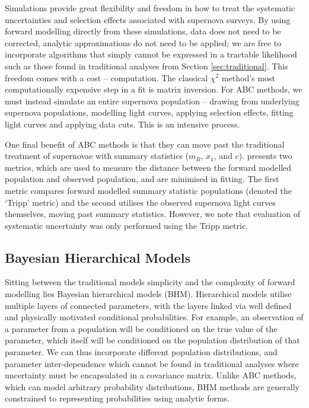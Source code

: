 \documentclass[a4paper,fleqn,usenatbib]{emulateapj}
\begin{document}
Simulations provide great flexibility and freedom in how to treat the systematic uncertainties and selection effects associated with supernova surveys. By using forward modelling directly from these simulations, data does not need to be corrected, analytic approximations do not need to be applied; we are free to incorporate algorithms that simply cannot be expressed in a tractable likelihood such as those found in traditional analyses from Section \ref{sec:traditional}. This freedom comes with a cost -- computation. The classical $\chi^2$ method's most computationally expensive step in a fit is matrix inversion. For ABC methods, we must instead simulate an entire supernova population -- drawing from underlying supernova populations, modelling light curves, applying selection effects, fitting light curves and applying data cuts. This is an intensive process.

One final benefit of ABC methods is that they can move past the traditional treatment of supernovae with summary statistics ($m_B$, $x_1$, and $c$). \citet{Jennings2016} presents two metrics, which are used to measure the distance between the forward modelled population and observed population, and are minimised in fitting. The first metric compares forward modelled summary statistic populations (denoted the `Tripp' metric) and the second utilises the observed supernova light curves themselves, moving past summary statistics. However, we note that evaluation of systematic uncertainty was only performed using the Tripp metric.

\subsection{Bayesian Hierarchical Models}

Sitting between the traditional models simplicity and the complexity of forward modelling lies Bayesian hierarchical models (BHM). Hierarchical models utilise multiple layers of connected parameters, with the layers linked via well defined and physically motivated conditional probabilities. For example, an observation of a parameter from a population will be conditioned on the true value of the parameter, which itself will be conditioned on the population distribution of that parameter. We can thus incorporate different population distributions, and parameter inter-dependence which cannot be found in traditional analyses where uncertainty must be encapsulated in a covariance matrix. Unlike ABC methods, which can model arbitrary probability distributions, BHM methods are generally constrained to representing probabilities using analytic forms.
\end{document}
